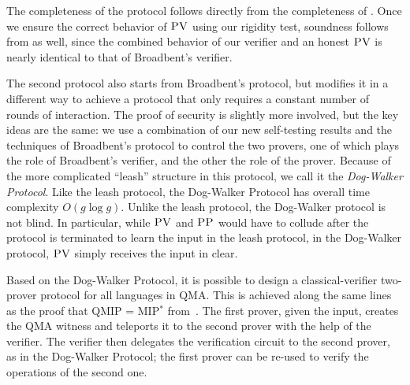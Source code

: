 \documentclass[11pt]{article}
\theoremstyle{remark}
\theoremstyle{definition}
\newcommand{\pv}{\textsc{PV}}
\newcommand{\pp}{\textsc{PP}}
\begin{document}
The completeness of the protocol follows directly from the completeness of \cite{broadbent15howtoverify}. Once we ensure the correct behavior of $\pv$ using our rigidity test, soundness follows from \cite{broadbent15howtoverify} as well, since the combined behavior of our verifier and an honest $\pv$ is nearly identical to that of Broadbent's verifier. 

The second protocol also starts from Broadbent's protocol, but modifies it in a
different way to achieve a protocol that only requires a constant number of rounds of
interaction. The proof of security is slightly more involved, but the key ideas are the same: we use a combination of our new self-testing results and the techniques of Broadbent's protocol to control the two provers, one of which plays the role of Broadbent's verifier, and the other the role of the prover. Because of the more complicated ``leash'' structure in this protocol, we call it the \emph{Dog-Walker Protocol}. 
 Like the leash protocol, the Dog-Walker Protocol has overall time complexity $O(g\log g)$. Unlike the leash protocol, the Dog-Walker protocol is not blind. In particular, while $\pv$ and $\pp$ would have to collude after the protocol is terminated to learn the input in the leash protocol, in the Dog-Walker protocol, $\pv$ simply receives the input in clear.


Based on the Dog-Walker Protocol, it is possible to design a classical-verifier  two-prover protocol for all languages in QMA. This is achieved along the same lines as the proof that QMIP = MIP$^*$ from~\cite{reichardt2012classical}. The first prover, given the input, creates the QMA witness and teleports it to the second prover with the help of the verifier. The verifier then delegates the verification circuit to the second prover, as in the Dog-Walker Protocol; the first prover can be re-used to verify the operations of the second one.
\end{document}
